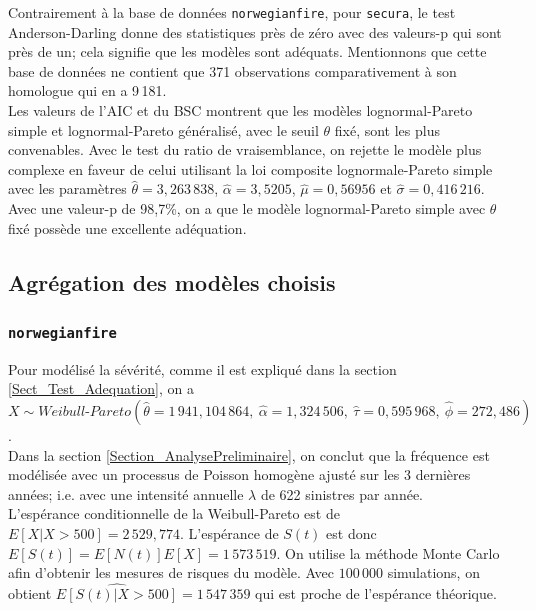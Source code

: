 		Contrairement à la base de données \texttt{norwegianfire}, pour \texttt{secura}, le test Anderson-Darling donne des statistiques près de zéro avec des valeurs-p qui sont près de un; cela signifie que les modèles sont adéquats. Mentionnons que cette base de données ne contient que 371 observations comparativement à son homologue qui en a 9\,181. \\

		Les valeurs de l'AIC et du BSC montrent que les modèles lognormal-Pareto simple et lognormal-Pareto généralisé, avec le seuil $\theta$ fixé, sont les plus convenables. Avec le test du ratio de vraisemblance, on rejette le modèle plus complexe en faveur de celui utilisant la loi composite lognormale-Pareto simple avec les paramètres $\hat{\theta}=3,263\,838$, $\hat{\alpha}=3,5205$, $\hat{\mu} = 0,56956$ et $\hat{\sigma}=0,416\,216$.\\
		
		Avec une valeur-p de 98,7\%, on a que le modèle lognormal-Pareto simple avec $\theta$ fixé possède une excellente adéquation.

	\subsection{Agrégation des modèles choisis}
	
		\subsubsection{\texttt{norwegianfire}}
		Pour modélisé la sévérité, comme il est expliqué dans la section \ref{Sect_Test_Adequation}, on a $X \sim Weibull\text{-}Pareto (\hat{\theta}=1\,941,104\,864,\: \hat{\alpha}=1,324\,506,\: \hat{\tau}=0,595\,968,\: \hat{\phi} = 272,486)$.\\
		
		Dans la section \ref{Section_AnalysePreliminaire}, on conclut que la fréquence est modélisée avec un processus de Poisson homogène ajusté sur les 3 dernières années; i.e. avec une intensité annuelle $\lambda$ de 622 sinistres par année.\\
		
		L'espérance conditionnelle de la Weibull-Pareto est de $E[X|X>500]=2\,529,774$. L'espérance de $S(t)$ est donc $E[S(t)]=E[N(t)]E[X]=1\,573\,519$. On utilise la méthode Monte Carlo afin d'obtenir les mesures de risques du modèle. Avec $100\,000$ simulations, on obtient $\widehat{E[S(t)|X>500]}=1\,547\,359$ qui est proche de l'espérance théorique.\\
		
